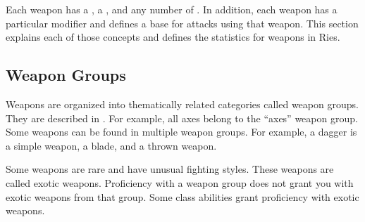     Each weapon has a , a , and any number of .
    In addition, each weapon has a particular  modifier and defines a base  for attacks using that weapon.
    This section explains each of those concepts and defines the statistics for weapons in Ries.

    \subsection{Weapon Groups}\label{Weapon Groups}

        Weapons are organized into thematically related categories called weapon groups. They are described in . For example, all axes belong to the ``axes'' weapon group. Some weapons can be found in multiple weapon groups. For example, a dagger is a simple weapon, a blade, and a thrown weapon.

        \label{Exotic Weapons} Some weapons are rare and have unusual fighting styles.
        These weapons are called exotic weapons.
        Proficiency with a weapon group does not grant you with exotic weapons from that group.
        Some class abilities grant proficiency with exotic weapons.

